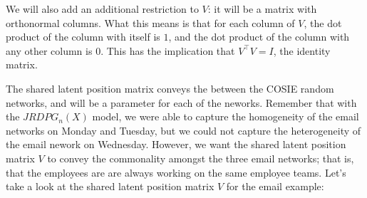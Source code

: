 \documentclass[letterpaper,10pt,english]{jupyterBook}
\begin{document}
\sphinxAtStartPar
We will also add an additional restriction to \(V\): it will be a matrix with orthonormal columns. What this means is that for each column of \(V\), the dot product of the column with itself is \(1\), and the dot product of the column with any other column is \(0\). This has the implication that \(V^\top V = I\), the identity matrix.

\sphinxAtStartPar
The shared latent position matrix conveys the  between the COSIE random networks, and will be a parameter for each of the neworks. Remember that with the \(JRDPG_n(X)\) model, we were able to capture the homogeneity of the email networks on Monday and Tuesday, but we could not capture the heterogeneity of the email nework on Wednesday. However, we want the shared latent position matrix \(V\) to convey the commonality amongst the three email networks; that is, that the employees are are always working on the same employee teams. Let’s take a look at the shared latent position matrix \(V\) for the email example:

\begin{sphinxVerbatim}[commandchars=\\\{\}]
     

  
  \PYG{p}{[}  \PYG{p}{]}

 \PYG{p}{[}\PYG{p}{]} \PYG{p}{[}   \PYG{p}{]}
            \PYG{p}{[}\PYG{p}{]} \PYG{p}{[}  \PYG{p}{]} 
\end{sphinxVerbatim}
\end{document}
